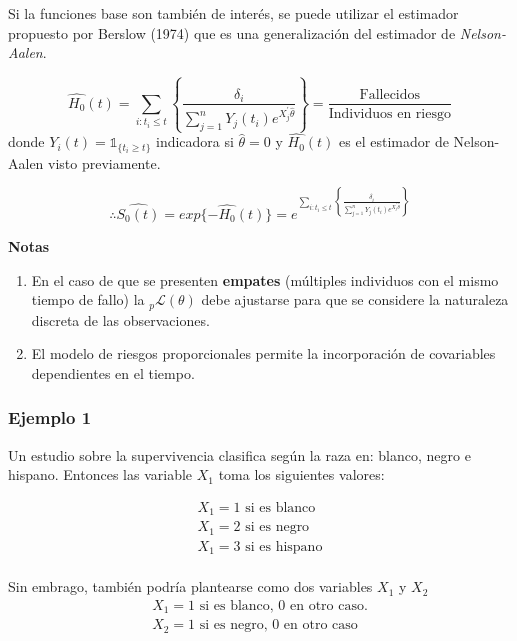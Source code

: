 \documentclass[
  a4paper,
  oneside,
  openany]{book}
\providecommand{\tightlist}{%
  \setlength{\itemsep}{0pt}\setlength{\parskip}{0pt}}
\begin{document}
Si la funciones base son también de interés, se puede utilizar el estimador propuesto por Berslow (1974) que es una generalización del estimador de \emph{Nelson-Aalen}.

\[\hat{H_{0}}(t) = \sum_{i:t_i\leq t}\left \{\frac{\delta_i}{\sum_{j = 1}^nY_j(t_i)e^{X_j^{'}\hat{\theta}}} \right \} = \frac{\mbox{Fallecidos}}{\mbox{Individuos en riesgo}}\]
donde \(Y_i(t) = \mathbb{1}_{\{t_i\geq t\}}\) indicadora si \(\hat{\theta} = 0\) y \(\hat{H_0}(t)\) es el estimador de Nelson-Aalen visto previamente.

\[\therefore \hat{S_0(t)}  = exp\{-\hat{H_0}(t)\} = e^{\sum_{i:t_i\leq t}\left \{\frac{\delta_i}{\sum_{j = 1}^nY_j(t_i)e^{X_j^{'}\hat{\theta}}} \right \}}\]

\textbf{Notas}

\begin{enumerate}
\def\labelenumi{\arabic{enumi}.}
\tightlist
\item
  En el caso de que se presenten \textbf{empates} (múltiples individuos con el mismo tiempo de fallo) la \(_p\mathscr{L}(\theta)\) debe ajustarse para que se considere la naturaleza discreta de las observaciones.
\item
  El modelo de riesgos proporcionales permite la incorporación de covariables dependientes en el tiempo.
\end{enumerate}

\hypertarget{ejemplo-1-2}{%
\subsubsection*{Ejemplo 1}\label{ejemplo-1-2}}


Un estudio sobre la supervivencia clasifica según la raza en: blanco, negro e hispano. Entonces las variable \(X_1\) toma los siguientes valores:

\[
\begin{array}{ll}
X_1 = \mbox{1 si es blanco } \\
X_1 = \mbox{2 si es negro } \\
X_1 = \mbox{3 si es hispano} \\
\end{array}
\]

Sin embrago, también podría plantearse como dos variables \(X_1\) y \(X_2\)
\[
\begin{array}{ll}
X_1 = 1 \mbox{ si es blanco, 0 en otro caso.}\\
X_2 = 1 \mbox{ si es negro, 0 en otro caso}\\
\end{array}
\]
\end{document}
